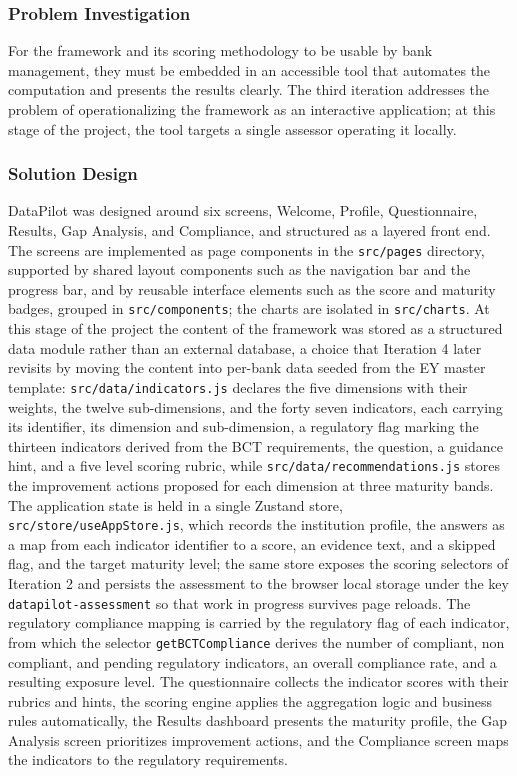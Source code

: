 \subsubsection{Problem Investigation}

For the framework and its scoring methodology to be usable by bank management, they must be embedded in an accessible tool that automates the computation and presents the results clearly. The third iteration addresses the problem of operationalizing the framework as an interactive application; at this stage of the project, the tool targets a single assessor operating it locally.

\subsubsection{Solution Design}

\begin{sloppypar}
DataPilot was designed around six screens, Welcome, Profile, Questionnaire, Results, Gap Analysis, and Compliance, and structured as a layered front end. The screens are implemented as page components in the \texttt{src/pages} directory, supported by shared layout components such as the navigation bar and the progress bar, and by reusable interface elements such as the score and maturity badges, grouped in \texttt{src/components}; the charts are isolated in \texttt{src/charts}. At this stage of the project the content of the framework was stored as a structured data module rather than an external database, a choice that Iteration 4 later revisits by moving the content into per-bank data seeded from the EY master template: \texttt{src/data/indicators.js} declares the five dimensions with their weights, the twelve sub-dimensions, and the forty seven indicators, each carrying its identifier, its dimension and sub-dimension, a regulatory flag marking the thirteen indicators derived from the BCT requirements, the question, a guidance hint, and a five level scoring rubric, while \texttt{src/data/recommendations.js} stores the improvement actions proposed for each dimension at three maturity bands. The application state is held in a single Zustand store, \texttt{src/store/useAppStore.js}, which records the institution profile, the answers as a map from each indicator identifier to a score, an evidence text, and a skipped flag, and the target maturity level; the same store exposes the scoring selectors of Iteration 2 and persists the assessment to the browser local storage under the key \texttt{datapilot-assessment} so that work in progress survives page reloads. The regulatory compliance mapping is carried by the regulatory flag of each indicator, from which the selector \texttt{getBCTCompliance} derives the number of compliant, non compliant, and pending regulatory indicators, an overall compliance rate, and a resulting exposure level. The questionnaire collects the indicator scores with their rubrics and hints, the scoring engine applies the aggregation logic and business rules automatically, the Results dashboard presents the maturity profile, the Gap Analysis screen prioritizes improvement actions, and the Compliance screen maps the indicators to the regulatory requirements.
\end{sloppypar}

